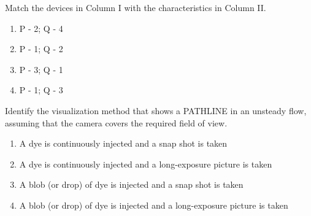     \item{
            Match the devices in Column I with the characteristics in Column II.
            
            \begin{multicols}{4}
				\begin{enumerate}
					\item P - 2; Q - 4
					\item P - 1; Q - 2
					\item P - 3; Q - 1
					\item P - 1; Q - 3
				\end{enumerate}
			\end{multicols}
        }
    \item{
        
           	Identify the visualization method that shows a PATHLINE in an unsteady flow, assuming that the
           	camera covers the required field of view.
				\begin{enumerate}
					\item A dye is continuously injected and a snap shot is taken
					\item A dye is continuously injected and a long-exposure picture is taken
					\item A blob (or drop) of dye is injected and a snap shot is taken
					\item A blob (or drop) of dye is injected and a long-exposure picture is taken
				\end{enumerate}

        
        }


